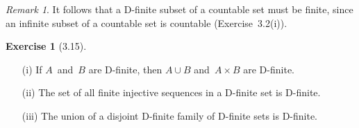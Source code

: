 \documentclass[letterpaper,12pt]{article}
\newcommand{\union}{\cup}
\theoremstyle{definition}
\newtheorem*{exer}{Exercise}
\theoremstyle{remark}
\newtheorem*{rmk}{Remark}
\begin{document}
\begin{rmk}
It follows that a D-finite subset of a countable set must be finite, since an infinite subset of a countable set is countable (Exercise~3.2(i)).
\end{rmk}

\begin{exer}[3.15]\
\begin{enumerate}[itemsep=0pt]
\item[(i)] If \(A\)~and~\(B\) are D-finite, then \(A\union B\) and~\(A\times B\) are D-finite.
\item[(ii)] The set of all finite injective sequences in a D-finite set is D-finite.
\item[(iii)] The union of a disjoint D-finite family of D-finite sets is D-finite.
\end{enumerate}
\end{exer}
\end{document}
